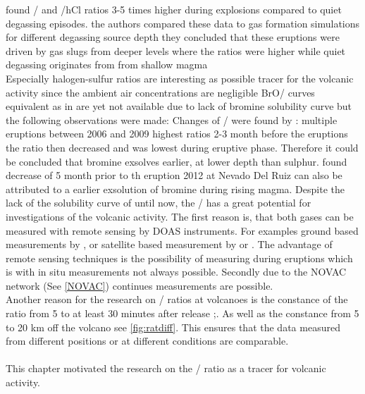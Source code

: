 \documentclass  [
  paper    = a4,
  BCOR     = 10mm,
  twoside,
  fontsize = 12pt,
  fleqn,
  toc      = bibnumbered,
  toc      = listofnumbered,
  numbers  = noendperiod,
  headings = normal,
  listof   = leveldown,
  version  = 3.03
]                                       {scrreprt}
\begin{document}
	\citet{burton2007magmatic}  found / and /hCl ratios 3-5 times higher during explosions  compared to quiet degassing episodes.
	the authors compared these data to gas formation simulations for different degassing source depth they concluded that these eruptions were driven by gas slugs from deeper levels where the ratios were higher while quiet degassing originates from from shallow magma\\
	Especially halogen-sulfur ratios are interesting as possible tracer for the volcanic activity since the ambient air concentrations are negligible
	BrO/  curves equivalent as in  are yet not available due to lack of  bromine solubility curve but the following observations were made:
	Changes of /  were found by \citet{bobrowski2006bromine}: multiple eruptions between 2006 and 2009 highest ratios 2-3 month before the eruptions the ratio then decreased and was lowest during eruptive phase. Therefore it could be concluded that bromine exsolves earlier, at lower depth than sulphur.
	\citet{lubcke2014bro} found decrease of   5 month prior to th eruption 2012 at Nevado Del Ruiz can also be attributed to a earlier exsolution of bromine during rising magma.
	Despite the lack of the solubility curve of   until now, the /  has a great potential for investigations of the volcanic activity. The first reason is, that both gases can be measured with remote sensing by DOAS instruments. For examples ground based measurements by \cite{bobrowski2007reactive}, \cite{lubcke2014optical} or satellite based measurement by \cite{Hörman et al 2013} or \cite{Beirle at al 2014}. The advantage of remote sensing techniques is the possibility of measuring during eruptions which is with in situ measurements not always possible.
	Secondly due to the NOVAC network (See \ref{NOVAC}) continues measurements are possible.\\
	Another reason for the research on /  ratios at volcanoes is the constance of the ratio from 5 to at least 30 minutes after release \citep{bobrowski2007reactive};\citep{lubcke2014optical}. As well as the constance from 5 to 20 km off the volcano see \ref{fig:ratdiff}. This ensures that the data measured from different positions or at different conditions are comparable.\\
	\\
	This chapter motivated the research on the /  ratio as a tracer for volcanic activity.
	
\end{document}

